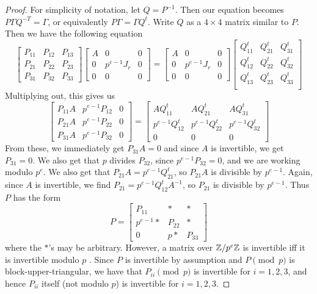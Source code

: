 \begin{proof}
	For simplicity of notation, let $Q = P^{-1}$. Then our equation becomes $P \Gamma Q^{-T} = \Gamma$, or equivalently $P \Gamma = \Gamma Q^t$. Write $Q$ as a $4 \times 4$ matrix similar to $P$. Then we have the following equation
	\[
	\begin{bmatrix} 
		P_{11} & P_{12} & P_{13} \\
		P_{21} & P_{22} & P_{23} \\
		P_{31} & P_{32} & P_{33} 
	\end{bmatrix}
	\begin{bmatrix}
		A & 0 & 0 \\
		0 &p^{e-1} J_r & 0 \\
		0 & 0 & 0 
	\end{bmatrix}
	= 
	\begin{bmatrix}
		A & 0 & 0 \\
		0 &p^{e-1} J_r & 0 \\
		0 & 0 & 0 
	\end{bmatrix}
	\begin{bmatrix} 
		Q_{11}^t & Q_{21}^t & Q_{31}^t \\
		Q_{12}^t & Q_{22}^t & Q_{32}^t \\
		Q_{13}^t & Q_{23}^t & Q_{33}^t \\
	\end{bmatrix}
	\]
	Multiplying out, this gives us
	\[
	\begin{bmatrix} 
		P_{11} A & p^{e-1}P_{12} & 0 \\
		P_{21} A & p^{e-1}P_{22} & 0\\
		P_{31} A & p^{e-1}P_{32} & 0
	\end{bmatrix}
	= 
	\begin{bmatrix} 
		A Q_{11}^t & A Q_{21}^t & A Q_{31}^t \\
		p^{e-1}Q_{12}^t & p^{e-1}Q_{22}^t & p^{e-1}Q_{32}^t \\
		0 & 0 & 0
	\end{bmatrix}
	\]
	From these, we immediately get $P_{31} A = 0$ and since $A$ is invertible, we get $P_{31} = 0$. We also get that $p$ divides $P_{32}$, since $p^{e-1} P_{32} = 0$, and we are working modulo $p^e$. We also get that $P_{21} A = p^{e-1} Q_{21}^t$, so $P_{21} A$ is divisible by $p^{e-1}$. Again, since $A$ is invertible, we find $P_{21} = p^{e-1} Q_{12}^t A^{-1}$, so $P_{21}$ is divisible by $p^{e-1}$. Thus $P$ has the form
	\[
	P = \begin{bmatrix}
		P_{11} & * & * \\
		p^{e-1} * & P_{22} & * \\
		0 & p * & P_{33}
	\end{bmatrix}
	\]
	where the $*$'s may be arbitrary. However, a matrix over $\mathbb{Z}/p^e \mathbb{Z}$ is invertible iff it is invertible modulo $p$ \cite{Ranum, HillarRhea}. Since $P$ is invertible by assumption and $P\pmod{p}$ is block-upper-triangular, we have that $P_{ii} \pmod{p}$ is invertible for $i=1,2,3$, and hence $P_{ii}$ itself (not modulo $p$) is invertible for $i=1,2,3$. 
	

\end{proof}
